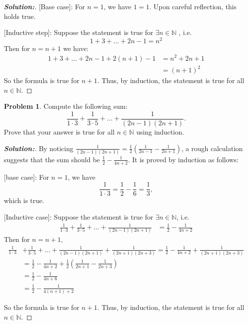 \documentclass[12pt]{article}
\theoremstyle{definition}\newtheorem{problem}{Problem}
\newenvironment{solution}{\begin{proof}[\bfseries\textup{Solution:}]}{\end{proof}}
\begin{document}
\begin{solution}

[Base case]: For $ n = 1 $, we have $ 1 =1 $. Upon careful reflection, this holds true. 


[Inductive step]: Suppose the statement is true for $ \exists n \in \mathbb{N}  $ , i.e. 
\begin{equation} 1+ 3+ \dots + 2n-1 = n^2 \end{equation}
 Then for $ n = n+1 $  we have: 
\begin{align}
    1+3+\dots + 2n-1 + 2(n+1)-1 &= n^2 + 2n+1 \\
    &= (n+1)^2
\end{align}
So the formula is true for $ n+1 $. Thus, by induction, the statement is true for all $ n \in \mathbb{N} $.

\end{solution}

\newpage
\begin{problem}
Compute the following sum:
\begin{equation*}
\frac{1}{1\cdot 3} + \frac{1}{3\cdot 5} + \dots + \frac{1}{(2n-1)(2n+1)} .
\end{equation*}
Prove that your answer is true for all $n\in\mathbb{N}$ using induction.
\end{problem}


\begin{solution}
By noticing $\frac{1}{(2n-1)(2n+1)} = \frac{1}{2} (\frac{1}{2n-1} - \frac{1}{2n+1}) $, a rough calculation suggests that the sum should be $ \frac{1}{2} - \frac{1}{4n+2} $. It is proved by induction as follows: 

[base case]: For $ n=1 $, we have $$ \frac{1}{1\cdot 3} = \frac{1}{2} - \frac{1}{6} = \frac{1}{3}, $$ which is true. 

[Inductive case]: Suppose the statement is true for $ \exists n \in \mathbb{N} $, i.e. \begin{align} 
\frac{1}{1 \cdot 3} + \frac{1}{3 \cdot 5} + \dots + \frac{1}{(2n-1)(2n+1)} &= \frac{1}{2} - \frac{1}{4n+2}
\end{align}
 Then for $ n = n+1, $ \begin{align} 
\frac{1}{1 \cdot 3} &+ \frac{1}{3 \cdot 5} + \dots + \frac{1}{(2n-1)(2n+1)} + \frac{1}{(2n+1)(2n+3)} = \frac{1}{2} - \frac{1}{4n+2} + \frac{1}{(2n+1)(2n+3)}  \\ 
&= \frac{1}{2} - \frac{1}{4n+2} + \frac{1}{2} (\frac{1}{2n+1} - \frac{1}{2n+3}) \\
&= \frac{1}{2} - \frac{1}{4n + 6} \\&= \frac{1}{2} - \frac{1}{4(n+1) + 2} 
 \end{align}
  
So the formula is true for $ n+1 $. Thus, by induction, the statement is true for all $ n \in \mathbb{N} $.





\end{solution}
\end{document}
